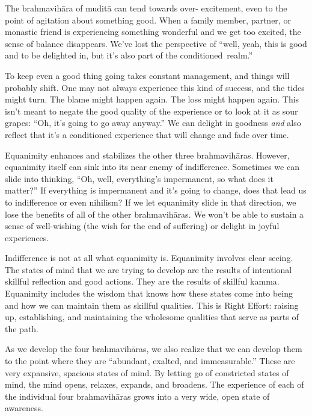 The brahmavihāra of muditā can tend towards over- \linebreak excitement, even to the point of agitation about \mbox{something} good. When a family member, partner, or monastic friend is experiencing something wonderful and we get too excited, the sense of balance disappears. We've lost the perspective of ``well, yeah, this is good and to be delighted in, but it's also part of the \mbox{conditioned realm.''}

To keep even a good thing going takes constant management, and things will probably shift. One may not always experience this kind of success, and the tides might turn. The blame might happen again. The \linebreak loss might happen again. This isn't meant to negate the good quality of the experience or to look at it as sour grapes: ``Oh, it's going to go away anyway.'' We can delight in goodness \emph{and} also reflect that it's a conditioned experience that will change and fade over time.

Equanimity enhances and stabilizes the other three brahmavihāras. However, equanimity itself can sink into its near enemy of indifference. Sometimes we can slide into thinking, ``Oh, well, everything's impermanent, so what does it matter?'' If everything is impermanent and it's going to change, does that lead us to indifference or even nihilism? If we let equanimity slide in that direction, we lose the benefits of all of the other brahmavihāras. We won't be able to sustain a sense of well-wishing (the wish for the end of suffering) or delight in joyful experiences.

{\parfillskip=0pt
Indifference is not at all what equanimity is. Equanimity involves clear seeing. The states of mind that we are trying to develop are the results of intentional skillful reflection and good actions. They are the results of skillful kamma. Equanimity includes the wisdom that knows how these states come into being and how we can maintain them as skillful qualities. This is Right Effort: raising up, establishing, and maintaining the wholesome qualities that serve as parts of the path.
\par}

As we develop the four brahmavihāras, we also realize that we can develop them to the point where they are ``abundant, exalted, and immeasurable.'' These are very expansive, spacious states of mind. By letting go of constricted states of mind, the mind opens, relaxes, expands, and broadens. The experience of each of the individual four brahmavihāras grows into a very wide, open state of awareness.

